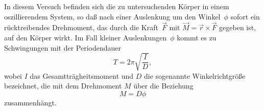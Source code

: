 In diesem Versuch befinden sich die zu untersuchenden Körper in einem
oszillierendem System, so daß nach einer Auslenkung um den Winkel~$\phi$
sofort ein rücktreibendes Drehmoment, das durch die Kraft~$\vec{F}$ mit
$\vec{M} = \vec{r} \times \vec{F}$ gegeben ist, auf den Körper wirkt.
Im Fall kleiner Auslenkungen~$\phi$ kommt es zu Schwingungen mit der
Periodendauer
\begin{equation}
  \label{eq:periode}
  T = 2 \pi \sqrt{\frac{I}{D}},
\end{equation}
wobei $I$ das Gesamtträgheitsmoment und $D$ die sogenannte
Winkelrichtgröße bezeichnet, die mit dem Drehmoment $M$ über die
Beziehung
\begin{equation}
  \label{eq:drehmoment-winkelricht}
  M = D \phi
\end{equation}
zusammenhängt.

